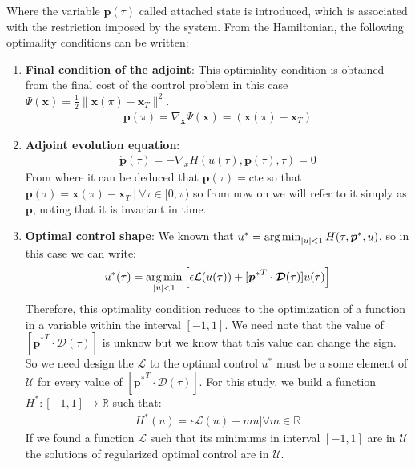 Where the variable $ \bm{p} (\tau) $ called attached state is introduced, which is associated with the restriction imposed by the system. From the Hamiltonian, the following optimality conditions can be written:
\begin{enumerate}

    \item \textbf{Final condition of the adjoint}: This optimiality condition is obtained from the final cost of the control problem in this case $ \Psi (\bm{x}) = \frac {1}{2} \| \bm{x} (\pi) - \bm{x}_T \|^2 $.
    \begin{gather}
        \bm{p}(\pi) = \nabla_{\bm{x}} \Psi(\bm{x}) =  (\bm{x} (\pi) - \bm{x}_T)
    \end{gather}
    \item \textbf{Adjoint evolution equation}:
    \begin{gather}
        \dot{\bm{p}}(\tau) = -\nabla_x H(u(\tau),\bm{p}(\tau),\tau) = 0
    \end{gather}
    From where it can be deduced that $ \bm {p} (\tau) = \text {cte} $ so that $ \bm {p} (\tau) = \bm {x} (\pi) - \bm { x} _T \ | \ \forall \tau \in [0, \pi) $ so from now on we will refer to it simply as $ \bm {p} $, noting that it is invariant in time.
    \item \textbf{Optimal control shape}: We known that $ u^* = \operatorname*{arg\,min}_{|u|<1} H(\tau,\bm{p}^*,u)$, so in this case we can write:
    \begin{gather}
        u^*(\tau) = \operatorname*{arg\,min}_{|u|<1}  \Big[   \epsilon \mathcal{L}(u(\tau)) + 
        [{\bm{p}^*}^T \cdot \bm{\mathcal{D}}(\tau)]
        u(\tau) \Big]
    \end{gather}
    Therefore, this optimality condition reduces to the optimization of a function in a variable within the interval $ [- 1,1] $. We need note that the value of $[{\bm{p}^*}^T \cdot \bm{\mathcal{D}}(\tau)]$ is unknow but we know that this value can change the sign. So we need design the $\mathcal{L}$ to the optimal control $u^*$ must be a some element of $\mathcal{U}$ for every value of $[{\bm{p}^*}^T \cdot \bm{\mathcal{D}}(\tau)]$. For this study, we build a function $H^*: [-1,1] \rightarrow \mathbb{R}$ such that:
    \begin{gather}
        H^*(u) = \epsilon \mathcal{L}(u) + mu  |  \forall m \in \mathbb{R}
    \end{gather}
    If we found a function $\mathcal{L}$ such that its minimums in interval $[-1,1]$ are in $\mathcal{U}$ the solutions of regularized optimal control are in $\mathcal{U}$.
\end{enumerate}
%
